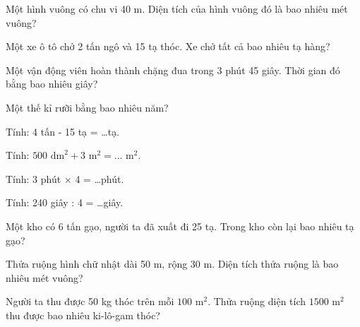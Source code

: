 \begin{ex}
Một hình vuông có chu vi 40 m. Diện tích của hình vuông đó là bao nhiêu mét vuông?
\end{ex}

\begin{ex}
Một xe ô tô chở 2 tấn ngô và 15 tạ thóc. Xe chở tất cả bao nhiêu tạ hàng?
\end{ex}

\begin{ex}
Một vận động viên hoàn thành chặng đua trong 3 phút 45 giây. Thời gian đó bằng bao nhiêu giây?
\end{ex}

\begin{ex}
Một thế kỉ rưỡi bằng bao nhiêu năm?
\end{ex}

\begin{ex}
Tính: 4 tấn - 15 tạ = \dots tạ.
\end{ex}

\begin{ex}
Tính: $500\text{ dm}^2 + 3\text{ m}^2 = \dots\text{ m}^2$.
\end{ex}

\begin{ex}
Tính: 3 phút $\times$ 4 = \dots phút.
\end{ex}

\begin{ex}
Tính: 240 giây : 4 = \dots giây.
\end{ex}

\begin{ex}
Một kho có 6 tấn gạo, người ta đã xuất đi 25 tạ. Trong kho còn lại bao nhiêu tạ gạo?
\end{ex}

\begin{ex}
Thửa ruộng hình chữ nhật dài 50 m, rộng 30 m. Diện tích thửa ruộng là bao nhiêu mét vuông?
\end{ex}

\begin{ex}
Người ta thu được 50 kg thóc trên mỗi $100\text{ m}^2$. Thửa ruộng diện tích $1500\text{ m}^2$ thu được bao nhiêu ki-lô-gam thóc?
\end{ex}


